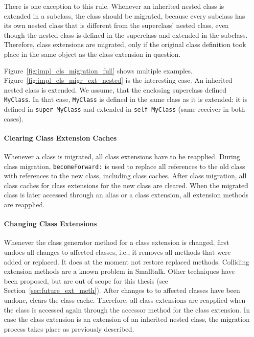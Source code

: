 There is one exception to this rule. Whenever an inherited nested class is extended in a subclass, the class should be migrated, because every subclass has its own nested class that is different from the superclass' nested class, even though the nested class is defined in the superclass and extended in the subclass. Therefore, class extensions are migrated, only if the original class definition took place in the same object as the class extension in question.

Figure~\ref{fig:impl_cls_migration_full} shows multiple examples. Figure~\ref{fig:impl_cls_migr_ext_nested} is the interesting case. An inherited nested class is extended. We assume, that the enclosing superclass defined \texttt{MyClass}. In that case, \texttt{MyClass} is defined in the same class as it is extended: it is defined in \texttt{super MyClass} and extended in \texttt{self MyClass} (same receiver in both cases).

\paragraph{Clearing Class Extension Caches}
Whenever a class is migrated, all class extensions have to be reapplied. During class migration, \texttt{becomeForward:} is used to replace all references to the old class with references to the new class, including class caches. After class migration, all class caches for class extensions for the new class are cleared. When the migrated class is later accessed through an alias or a class extension, all extension methods are reapplied.

\paragraph{Changing Class Extensions}
Whenever the class generator method for a class extension is changed, \msname first undoes all changes to affected classes, i.e., it removes all methods that were added or replaced. It does at the moment not restore replaced methods. Colliding extension methods are a known problem in Smalltalk. Other techniques have been proposed, but are out of scope for this thesis (see Section~\ref{sec:future_ext_meth}). After changes to to affected classes have been undone, \msname clears the class cache. Therefore, all class extensions are reapplied when the class is accessed again through the accessor method for the class extension. In case the class extension is an extension of an inherited nested class, the migration process takes place as previously described.

